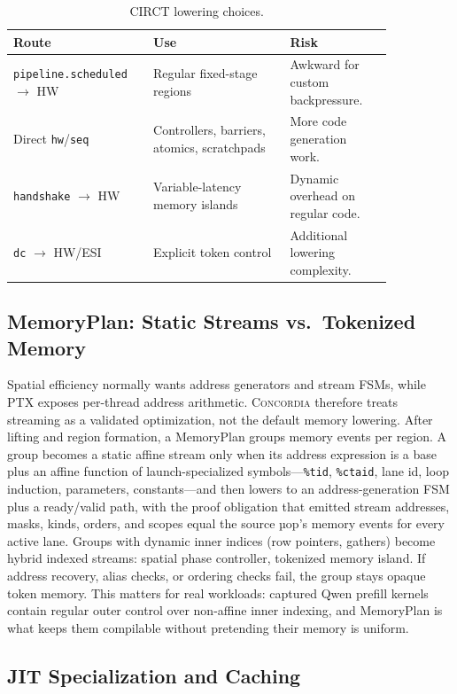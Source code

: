 \documentclass[sigplan,nonacm]{acmart}
\newcommand{\sys}{\textsc{Concordia}\xspace}
\begin{document}
\begin{table}[t]
\centering
\caption{CIRCT lowering choices.}
\label{tab:circt}
\small
\begin{tabular}{p{0.29\linewidth}p{0.32\linewidth}p{0.24\linewidth}}
\toprule
Route & Use & Risk \\
\midrule
\texttt{pipeline.scheduled} $\rightarrow$ HW & Regular fixed-stage
regions & Awkward for custom backpressure. \\
Direct \texttt{hw}/\texttt{seq} & Controllers, barriers, atomics,
scratchpads & More code generation work. \\
\texttt{handshake} $\rightarrow$ HW & Variable-latency memory islands &
Dynamic overhead on regular code. \\
\texttt{dc} $\rightarrow$ HW/ESI & Explicit token control & Additional
lowering complexity. \\
\bottomrule
\end{tabular}
\end{table}

\subsection{MemoryPlan: Static Streams vs.\ Tokenized Memory}
\label{sec:memoryplan}

Spatial efficiency normally wants address generators and stream FSMs, while
PTX exposes per-thread address arithmetic.  \sys therefore treats streaming
as a validated optimization, not the default memory lowering.  After
lifting and region formation, a MemoryPlan groups memory events per region.
A group becomes a static affine stream only when its address expression is a
base plus an affine function of launch-specialized symbols---\texttt{\%tid},
\texttt{\%ctaid}, lane id, loop induction, parameters, constants---and then
lowers to an address-generation FSM plus a ready/valid path, with the proof
obligation that emitted stream addresses, masks, kinds, orders, and scopes
equal the source µop's memory events for every active lane.  Groups with
dynamic inner indices (row pointers, gathers) become hybrid indexed streams:
spatial phase controller, tokenized memory island.  If address recovery,
alias checks, or ordering checks fail, the group stays opaque token memory.
This matters for real workloads: captured Qwen prefill kernels contain
regular outer control over non-affine inner indexing, and MemoryPlan is what
keeps them compilable without pretending their memory is uniform.

\subsection{JIT Specialization and Caching}
\label{sec:jit}
\end{document}
